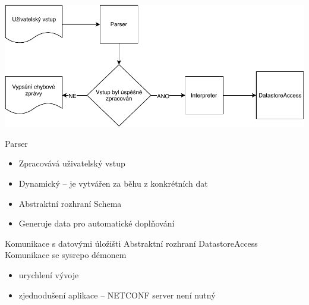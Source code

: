 \documentclass[czech,aspectratio=169]{beamer}
\begin{document}
\begin{frame}[plain,label=tokDat]
\begin{center}
    \includegraphics[width=.9\textwidth]{diagram}
\end{center}
\end{frame}

\begin{frame}{Parser}
    \begin{itemize}[<+->]
        \item Zpracovává uživatelský vstup
        \item Dynamický -- je vytvářen za běhu z konkrétních dat
        \item Abstraktní rozhraní Schema
        \item Generuje data pro automatické doplňování
    \end{itemize}
\end{frame}


\begin{frame}{Komunikace s datovými úložišti}
    Abstraktní rozhraní DatastoreAccess\pause{}
    \vfill
    Komunikace se sysrepo démonem\pause{}
    \begin{itemize}[<+->]
        \item urychlení vývoje
        \item zjednodušení aplikace -- NETCONF server není nutný
    \end{itemize}

    \vfill

\end{frame}
\end{document}
